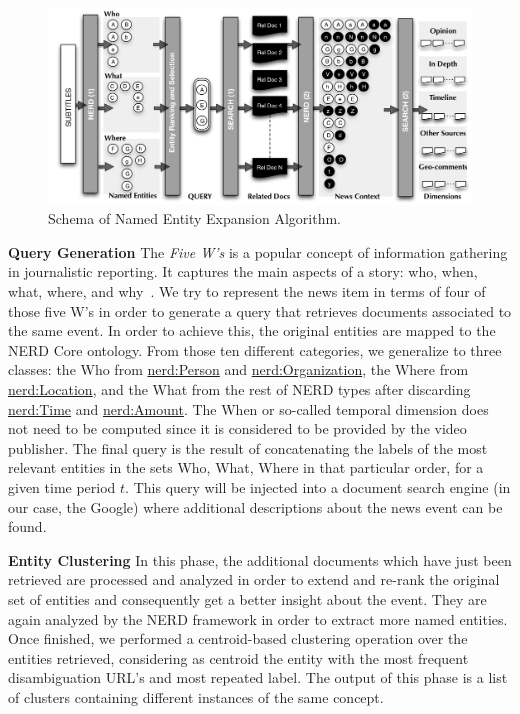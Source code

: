 \documentclass{llncs}
\begin{document}
\begin{figure}[t!]
\centering
\includegraphics[width=1\textwidth]{figure/ExpansionDiagram}
\caption{Schema of Named Entity Expansion Algorithm.}
\label{fig:namedEntityExpansion}%
\end{figure}

\textbf{Query Generation} The \emph{Five W's} is a popular concept of information gathering in journalistic reporting. It captures the main aspects of a story: who, when, what, where, and why~\cite{LiJia2007}. We try to represent the news item in terms of four of those five W's in order to generate a query that retrieves documents associated to the same event. In order to achieve this, the original entities are mapped to the NERD Core ontology. From those ten different categories, we generalize to three classes: the Who from \url{nerd:Person} and \url{nerd:Organization}, the Where from \url{nerd:Location}, and the What from the rest of NERD types after discarding \url{nerd:Time} and \url{nerd:Amount}. The When or so-called temporal dimension does not need to be computed since it is considered to be provided by the video publisher. The final query is the result of concatenating the labels of the most relevant entities in the sets Who, What, Where in that particular order, for a given time period $t$.  
This query will be injected into a document search engine (in our case, the Google) where additional descriptions about the news event can be found.

\textbf{Entity Clustering}
In this phase, the additional documents which have just been retrieved are processed and analyzed in order to extend and re-rank the original set of entities and consequently get a better insight about the event. They are again analyzed by the NERD framework in order to extract more named entities. Once finished, we performed a centroid-based clustering operation over the entities retrieved, considering as centroid the entity with the most frequent disambiguation URL's and most repeated label. The output of this phase is a list of clusters containing different instances of the same concept.
\end{document}
